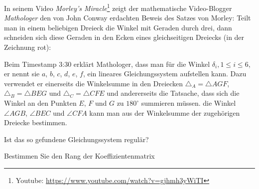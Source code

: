 In seinem Video {\em Morley's Miracle}\footnote{Youtube: \url{https://www.youtube.com/watch?v=gjhmh3yWiTI}}
zeigt der mathematische Video-Blogger
{\em Mathologer} den von John Conway erdachten Beweis des Satzes von Morley:
Teilt man in einem beliebigen Dreieck die Winkel mit Geraden durch drei, dann
schneiden sich diese Geraden in den Ecken eines gleichseitigen Dreiecks
(in der Zeichnung rot):
\begin{center}
\end{center}
Beim Timestamp 3:30 erklärt Mathologer, dass man für die Winkel
$\delta_i,1\le i\le 6$, er nennt sie $a$, $b$, $c$, $d$, $e$, $f$, ein
lineares Gleichungssystem aufstellen kann. 
Dazu verwendet er einerseits die Winkelsumme in den Dreiecken
$\triangle_A=\triangle AGF$,
$\triangle_B=\triangle BEG$ und $\triangle_C=\triangle CFE$
und andererseits die Tatsache, dass sich die
Winkel an den Punkten $E$, $F$ und $G$ zu $180^\circ$ summieren müssen.
die Winkel $\angle AGB$, $\angle BEC$ und $\angle CFA$ kann man aus
der Winkelsumme der zugehörigen Dreiecke bestimmen.
\begin{teilaufgaben}
\item
Ist das so gefundene Gleichungssystem regulär?
\item
Bestimmen Sie den Rang der Koeffizientenmatrix
\end{teilaufgaben}

